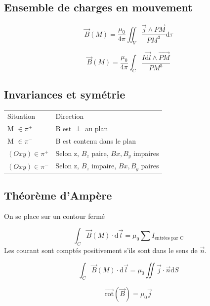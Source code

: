\documentclass[french]{yLectureNote}
\renewcommand{\vec}{\overrightarrow}
\newcommand{\dd}{\mathrm{d}}
\newcommand{\B}{\vec{B}(M)}
\newcommand{\pip}{\pi^+}
\newcommand{\pim}{\pi^-}
\newcommand{\rot}{\vec{\mathrm{rot}}}
\begin{document}
\subsection{Ensemble de charges en mouvement}
\begin{theorem}
    $$\B = \frac{\mu_0}{4\pi}\iint_V \frac{\vec{j}\wedge \vec{PM}}{PM^3}\dd \tau$$
\end{theorem}
\begin{theorem}
            $$\B = \frac{\mu_0}{4\pi}\int_C \frac{I\vec{\dd l}\wedge \vec{PM}}{PM^3}$$
\end{theorem}
\subsection{Invariances et symétrie}
\begin{center}
\begin{tabular}{ll}
Situation & Direction\\
M \(\in \pip\) & B est \(\perp\) au plan\\
M \(\in \pim\) & B est contenu dans le plan\\
\( (Oxy) \in  \pip\) & Selon z, \(B_z\) paire, \(Bx,B_y\) impaires\\
\( (Oxy) \in  \pim\) & Selon z, \(B_z\) impaire, \(Bx,B_y\) paires
\end{tabular}
\end{center}
\subsection{Théorème d'Ampère}
On se place sur un contour fermé

\begin{theorem}
\[\int_C \vec{B}(M)\cdot \dd \vec{l} = \mu_0 \sum I_{\text{entrées par C}} \]
Les courant sont comptés positivement s'ils sont dans le sens de \(\vec{n}\).
\end{theorem}

\begin{theorem}
 \[\int_C\B\cdot \dd \vec{l} = \mu_0 \iint \vec{j}\cdot \vec{n}\dd S\]
\end{theorem}

\begin{theorem}
\[\rot(\vec{B})=\mu_0 \vec{j}\]
\end{theorem}
\end{document}

